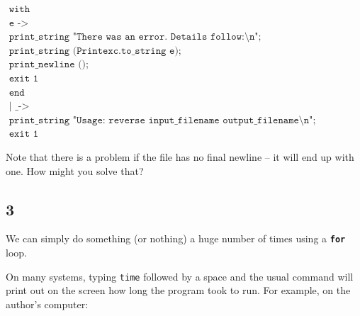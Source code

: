 \documentclass[]{book}
\newcommand{\smspace}{\vspace{4mm}}
\begin{document}
\begin{center}
{\begin{minipage}{0.9\textwidth}
$\texttt{\ \ \ \ \ \ \ \ with}$\\
$\texttt{\ \ \ \ \ \ \ \ \ \ e ->}$\\
$\texttt{\ \ \ \ \ \ \ \ \ \ \ \ print\_string "There was an error.\ Details follow:\textbackslash n";}$\\
$\texttt{\ \ \ \ \ \ \ \ \ \ \ \ print\_string (Printexc.to\_string e);}$\\
$\texttt{\ \ \ \ \ \ \ \ \ \ \ \ print\_newline ();}$\\
$\texttt{\ \ \ \ \ \ \ \ \ \ \ \ exit 1}$\\
$\texttt{\ \ \ \ \ \ end}$\\
$\texttt{\ \ |\ \_ ->}$\\
$\texttt{\ \ \ \ \ \ print\_string "Usage:\ reverse input\_filename output\_filename\textbackslash n";}$\\
$\texttt{\ \ \ \ \ \ exit 1}$\vphantom{g}
\end{minipage}}
\end{center}
\smspace

\noindent Note that there is a problem if the file has no final newline -- it will end
up with one. How might you solve that?

\subsection*{3}
We can simply do something (or nothing) a huge number of times using a \textbf{\texttt{for}} loop. 

\smspace
\noindent{}
\smspace

\noindent On many systems, typing \texttt{time} followed by a space and the usual command will print out on the screen how long the program took to run. For example, on the author's computer:
\end{document}
